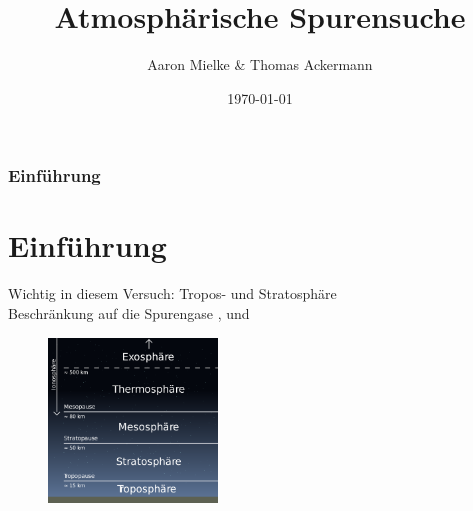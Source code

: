 \documentclass{beamer}
\title{Atmosphärische Spurensuche}
\author{Aaron Mielke \& Thomas Ackermann}
\date{\today}
\begin{document}
\maketitle


\begin{frame}
\frametitle{Einführung}
    \section{Einführung}
    Wichtig in diesem Versuch: Tropos- und Stratosphäre\\
    Beschränkung auf die Spurengase ,  und  

    \begin{figure}[h]
        \includegraphics[width=0.4\textwidth]{fig/photo/erdatmosphäre.png}
    \end{figure}
\end{frame}




\end{document}
